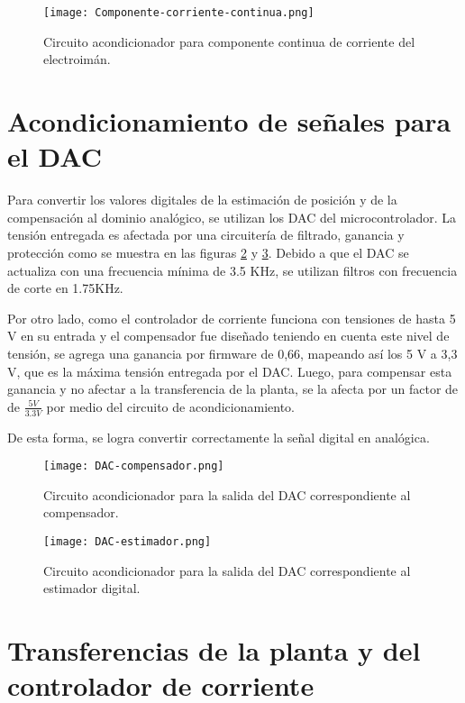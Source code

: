 \begin{figure}[H]
	\centering
	\texttt{[image: Componente-corriente-continua.png]}
	\caption{Circuito acondicionador para componente continua de corriente del electroimán.
	}
	\label{fig:componente-corriente-continua}
\end{figure}

\section{Acondicionamiento de señales para el DAC}

\noindent Para convertir los valores digitales de la estimación de posición y de la compensación al dominio analógico, se utilizan los DAC del microcontrolador. La tensión entregada es afectada por una circuitería de filtrado, ganancia y protección como se muestra en las figuras \ref{fig:DAC-compensador} y \ref{fig:DAC-estimador}. Debido a que el DAC se actualiza con una frecuencia mínima de 3.5 KHz, se utilizan filtros con frecuencia de corte en 1.75KHz.

\noindent Por otro lado, como el controlador de corriente funciona con tensiones de hasta 5 V en su entrada y el compensador fue diseñado teniendo en cuenta este nivel de tensión, se agrega una ganancia por firmware de 0,66, mapeando así los 5 V a 3,3 V, que es la máxima tensión entregada por el DAC. Luego, para compensar esta ganancia y no afectar a la transferencia de la planta, se la afecta por un factor de de $\frac{5V}{3.3V}$ por medio del circuito de acondicionamiento.

\noindent De esta forma, se logra convertir correctamente la señal digital en analógica.


\begin{figure}[H]
	\centering
	\texttt{[image: DAC-compensador.png]}
	\caption{Circuito acondicionador para la salida del DAC correspondiente al compensador.}
	\label{fig:DAC-compensador}
\end{figure}

\begin{figure}[H]
	\centering
	\texttt{[image: DAC-estimador.png]}
	\caption{Circuito acondicionador para la salida del DAC correspondiente al estimador digital.}
	\label{fig:DAC-estimador}
\end{figure}

\section{Transferencias de la planta y del controlador de corriente}

